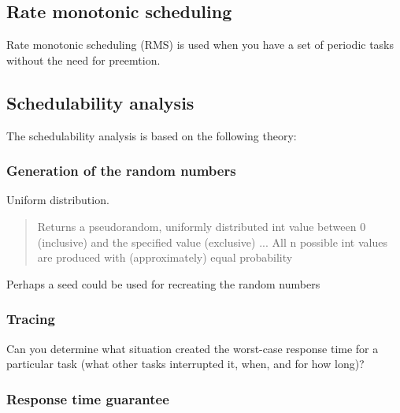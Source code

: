 \subsection{Rate monotonic scheduling}
Rate monotonic scheduling (RMS) is used when you have a set of periodic tasks without the need for preemtion.



\subsection{Schedulability analysis}
The schedulability analysis is based on the following theory:

\subsubsection{Generation of the random numbers}
Uniform distribution. 

\begin{quotation}
Returns a pseudorandom, uniformly distributed int value between 0 (inclusive) and the specified value (exclusive) ... All n possible int values are produced with (approximately) equal probability
\end{quotation}

Perhaps a seed could be used for recreating the random numbers

\subsubsection{Tracing}
Can you determine what situation created the worst-case response time for a particular task (what other tasks interrupted it, when, and for how long)?


\subsubsection{Response time guarantee}



